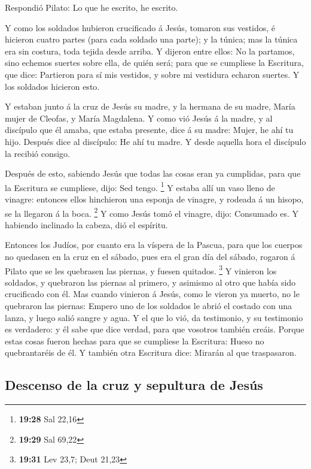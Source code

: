  Respondió Pilato: Lo que he escrito, he escrito.

 Y como los soldados hubieron crucificado á Jesús,
tomaron sus vestidos, é hicieron cuatro partes (para cada soldado una
parte); y la túnica; mas la túnica era sin costura, toda tejida desde
arriba.  Y dijeron entre ellos: No la partamos, sino
echemos suertes sobre ella, de quién será; para que se cumpliese la
Escritura, que dice: Partieron para sí mis vestidos, y sobre mi
vestidura echaron suertes. Y los soldados hicieron esto.

 Y estaban junto á la cruz de Jesús su madre, y la
hermana de su madre, María mujer de Cleofas, y María Magdalena.
 Y como vió Jesús á la madre, y al discípulo que él
amaba, que estaba presente, dice á su madre: Mujer, he ahí tu hijo.
 Después dice al discípulo: He ahí tu madre. Y desde
aquella hora el discípulo la recibió consigo.

 Después de esto, sabiendo Jesús que todas las cosas eran
ya cumplidas, para que la Escritura se cumpliese, dijo: Sed tengo.
\footnote{\textbf{19:28} Sal 22,16}  Y estaba allí un
vaso lleno de vinagre: entonces ellos hinchieron una esponja de vinagre,
y rodeada á un hisopo, se la llegaron á la boca. \footnote{\textbf{19:29}
  Sal 69,22}  Y como Jesús tomó el vinagre, dijo:
Consumado es. Y habiendo inclinado la cabeza, dió el espíritu.

 Entonces los Judíos, por cuanto era la víspera de la
Pascua, para que los cuerpos no quedasen en la cruz en el sábado, pues
era el gran día del sábado, rogaron á Pilato que se les quebrasen las
piernas, y fuesen quitados. \footnote{\textbf{19:31} Lev 23,7; Deut
  21,23}  Y vinieron los soldados, y quebraron las
piernas al primero, y asimismo al otro que había sido crucificado con
él.  Mas cuando vinieron á Jesús, como le vieron ya
muerto, no le quebraron las piernas:  Empero uno de los
soldados le abrió el costado con una lanza, y luego salió sangre y agua.
 Y el que lo vió, da testimonio, y su testimonio es
verdadero: y él sabe que dice verdad, para que vosotros también creáis.
 Porque estas cosas fueron hechas para que se cumpliese
la Escritura: Hueso no quebrantaréis de él.  Y también
otra Escritura dice: Mirarán al que traspasaron.

\hypertarget{descenso-de-la-cruz-y-sepultura-de-jesuxfas}{%
\subsection{Descenso de la cruz y sepultura de
Jesús}\label{descenso-de-la-cruz-y-sepultura-de-jesuxfas}}

